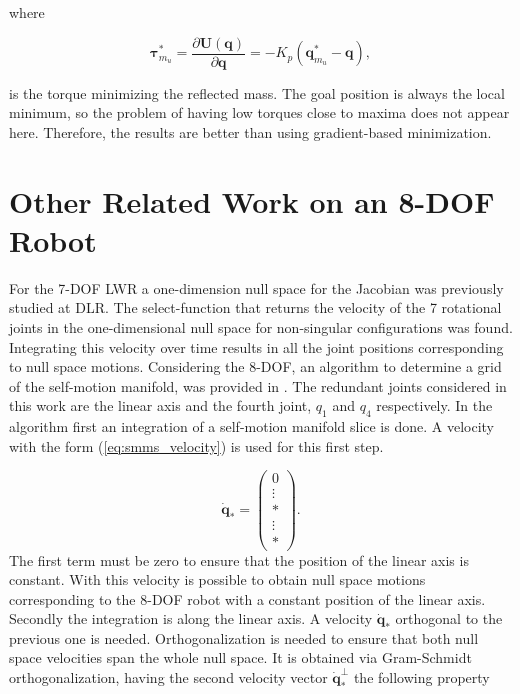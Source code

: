 where 

\begin{equation}
\mathbf{\tau}_{m_u}^\ast = \frac{\partial {\mathbf{U}(\mathbf{q})}}{\partial {\mathbf{q}}} = - K_p (\mathbf{q}_{m_u}^\ast - \mathbf{q}),
\label{eq:torque_pot_intro}
\end{equation}

is the torque minimizing the reflected mass.
The goal position is always the local minimum, so the problem of having low torques close to maxima does not appear here. Therefore, the results are better than using gradient-based minimization.


\section{Other Related Work on an 8-DOF Robot}
\label{sec:Fabianstuff}


For the 7-DOF LWR a  one-dimension null space for the Jacobian   was previously studied at DLR.  
The select-function that returns the velocity of the 7 rotational joints in the one-dimensional null space for non-singular configurations was found. Integrating this velocity over time results in all the joint positions corresponding to null space motions.
%
Considering the  8-DOF, an algorithm to determine a grid of the self-motion manifold, was provided in \cite{fabianthesis}. The redundant joints considered in this work are the linear axis and the fourth joint, $q_1$ and $q_4$ respectively. In the algorithm first an integration of a self-motion manifold slice is done. A velocity with the form (\ref{eq:smms_velocity}) is used for this first step. 

\begin{equation}
\dot{\mathbf{q}}_* =\begin{pmatrix}0 \\ \vdots  \\ *\\ \vdots\\ *\end{pmatrix}.
\label{eq:smms_velocity}
\end{equation} 
The first term must be zero to ensure that the position of the linear axis is constant.
With this velocity is possible to obtain null space motions corresponding to the 8-DOF robot with a constant position of the linear axis.
Secondly the integration is along the linear axis. A velocity $\dot{\mathbf{q}}_*$ orthogonal to the previous one is needed. Orthogonalization is needed to ensure that both null space velocities span the whole null space. It is obtained via Gram-Schmidt orthogonalization, having the second velocity vector $\dot{\mathbf{q}}_*^{\bot}$ the following property

